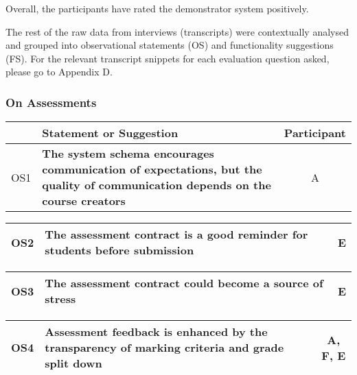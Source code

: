 Overall, the participants have rated the demonstrator system positively.

The rest of the raw data from interviews (transcripts) were contextually analysed and grouped into 
observational statements (OS) and functionality suggestions (FS).
For the relevant transcript snippets for each evaluation question asked, please go to Appendix D.

\subsubsection{On Assessments}

\begin{table}[!ht]
	\begin{tabularx}{\textwidth}{|c|X|c|}
		\hline
		& Statement or Suggestion & Participant\\
		\hline
		OS1 & \textbf{The system schema encourages communication of expectations, but the quality of communication depends on the course creators} & A                 \\
		\hline
	\end{tabularx}
\end{table}

\begin{table}[!ht]
	\begin{tabularx}{\textwidth}{|c|X|c|}
		\hline
		OS2 & \textbf{The assessment contract is a good reminder for students before submission} & E                 \\
		\hline
	\end{tabularx}
\end{table}

\begin{table}[!ht]
	\begin{tabularx}{\textwidth}{|c|X|c|}
		\hline
		OS3 & \textbf{The assessment contract could become a source of stress} & E                 \\
		\hline
	\end{tabularx}
\end{table}

\begin{table}[!ht]
	\begin{tabularx}{\textwidth}{|c|X|c|}
		\hline
		OS4 & \textbf{Assessment feedback is enhanced by the transparency of marking criteria and grade split down} & A, F, E                 \\
		\hline
	\end{tabularx}
\end{table}

